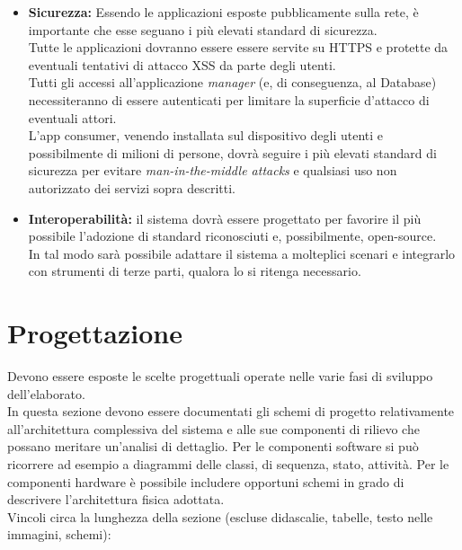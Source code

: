 \documentclass[12pt]{article}
\begin{document}
\begin{itemize}
\item \textbf{Sicurezza:} Essendo le applicazioni esposte pubblicamente sulla rete, è importante che esse seguano i più elevati standard di sicurezza.\\
Tutte le applicazioni dovranno essere essere servite su HTTPS e protette da eventuali tentativi di attacco XSS da parte degli utenti.\\
Tutti gli accessi all'applicazione \textit{manager} (e, di conseguenza, al Database) necessiteranno di essere autenticati per limitare la superficie d'attacco di eventuali attori.\\
L'app consumer, venendo installata sul dispositivo degli utenti e possibilmente di milioni di persone, dovrà seguire i più elevati standard di sicurezza per evitare \textit{man-in-the-middle attacks} e qualsiasi uso non autorizzato dei servizi sopra descritti.

\item \textbf{Interoperabilità:} il sistema dovrà essere progettato per favorire il più possibile l'adozione di standard riconosciuti e, possibilmente, open-source.\\
In tal modo sarà possibile adattare il sistema a molteplici scenari e integrarlo con strumenti di terze parti, qualora lo si ritenga necessario.
\end{itemize}

\section{Progettazione}

Devono essere esposte le scelte progettuali operate nelle varie fasi di sviluppo dell'elaborato.\\

In questa sezione devono essere documentati gli schemi di progetto relativamente all'architettura complessiva del sistema e alle sue componenti di rilievo che possano meritare un'analisi di dettaglio. Per le componenti software si può ricorrere ad esempio a diagrammi delle classi, di sequenza, stato, attività. Per le componenti hardware è possibile includere opportuni schemi in grado di descrivere l'architettura fisica adottata.\\

Vincoli circa la lunghezza della sezione (escluse didascalie, tabelle, testo nelle immagini, schemi):
\end{document}
